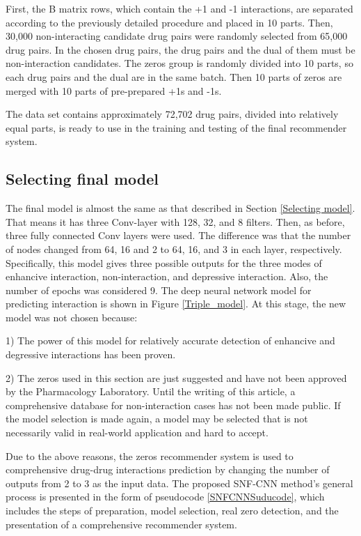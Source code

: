 \documentclass{bmcart}
\begin{document}
First, the B matrix rows, which contain the +1 and -1 interactions, are separated according to the previously detailed procedure and placed in 10 parts. Then, 30,000 non-interacting candidate drug pairs were randomly selected from 65,000 drug pairs. In the chosen drug pairs, the drug pairs and the dual of them must be non-interaction candidates. The zeros group is randomly divided into 10 parts, so each drug pairs and the dual are in the same batch. Then 10 parts of zeros are merged with 10 parts of pre-prepared +1s and -1s. 

The data set contains approximately 72,702 drug pairs, divided into relatively equal parts, is ready to use in the training and testing of the final recommender system.

\subsection*{Selecting final model}
The final model is almost the same as that described in Section
\ref{Selecting model}. That means it has three Conv-layer with 128, 32, and 8 filters. Then, as before, three fully connected Conv layers were used. The difference was that the number of nodes changed from 64, 16 and 2 to 64, 16, and 3 in each layer, respectively. Specifically, this model gives three possible outputs for the three modes of enhancive interaction, non-interaction, and depressive interaction. Also, the number of epochs was considered 9. The deep neural network model for predicting interaction is shown in Figure
\ref{Triple_model}. At this stage, the new model was not chosen because:

1) The power of this model for relatively accurate detection of enhancive and degressive interactions has been proven.

2) The zeros used in this section are just suggested and have not been approved by the Pharmacology Laboratory. Until the writing of this article, a comprehensive database for non-interaction cases has not been made public. If the model selection is made again, a model may be selected that is not necessarily valid in real-world application and hard to accept.

Due to the above reasons, the zeros recommender system is used to comprehensive drug-drug interactions prediction by changing the number of outputs from 2 to 3 as the input data. The proposed SNF-CNN method's general process is presented in the form of pseudocode \ref{SNFCNNSuducode}, which includes the steps of preparation, model selection, real zero detection, and the presentation of a comprehensive recommender system.
\end{document}
